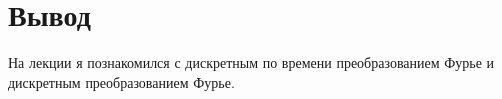 \chapter{Вывод}
\label{ch:сhap5}

На лекции я познакомился с дискретным по времени преобразованием Фурье и дискретным преобразованием Фурье.
\endinput